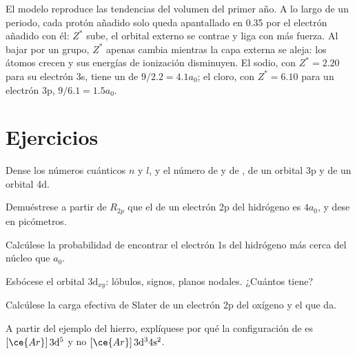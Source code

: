 El modelo reproduce las tendencias del volumen del primer año. A lo largo de un periodo, cada
protón añadido solo queda apantallado en 0.35 por el electrón añadido con él: $Z^*$ sube,
el orbital externo se contrae y liga con más fuerza. Al bajar por un grupo, $Z^*$ apenas
cambia mientras la capa externa se aleja: los átomos crecen y sus energías de ionización
disminuyen. El sodio, con $Z^* = 2.20$ para su electrón 3s, tiene un  de
$9/2.2 = 4.1a_0$; el cloro, con $Z^* = 6.10$ para un electrón 3p, $9/6.1 = 1.5a_0$.

\section{Ejercicios}

\begin{exercise}[$\star$]\label{exo:b2:atomic-orbitals:1}
Dense los números cuánticos $n$ y $l$, y el número de  y de , de un orbital 3p y de un orbital 4d.
\end{exercise}

\begin{exercise}[$\star$]\label{exo:b2:atomic-orbitals:2}
Demuéstrese a partir de $R_{2p}$ que el  de un electrón 2p del hidrógeno es
$4a_0$, y dese en picómetros.
\end{exercise}

\begin{exercise}[$\star$]\label{exo:b2:atomic-orbitals:3}
Calcúlese la probabilidad de encontrar el electrón 1s del hidrógeno más cerca del
núcleo que $a_0$.
\end{exercise}

\begin{exercise}[$\star$]\label{exo:b2:atomic-orbitals:4}
Esbócese el orbital $3\mathrm d_{xy}$: lóbulos, signos, planos nodales. ¿Cuántos  tiene?
\end{exercise}

\begin{exercise}[$\star\star$]\label{exo:b2:atomic-orbitals:5}
Calcúlese la carga efectiva de Slater de un electrón 2p del oxígeno y el  que da.
\end{exercise}

\begin{exercise}[$\star\star$]\label{exo:b2:atomic-orbitals:6}
A partir del ejemplo del hierro, explíquese por qué la configuración de  es
$[\ce{Ar}]\,3\mathrm d^5$ y no $[\ce{Ar}]\,3\mathrm d^3 4\mathrm s^2$.
\end{exercise}

